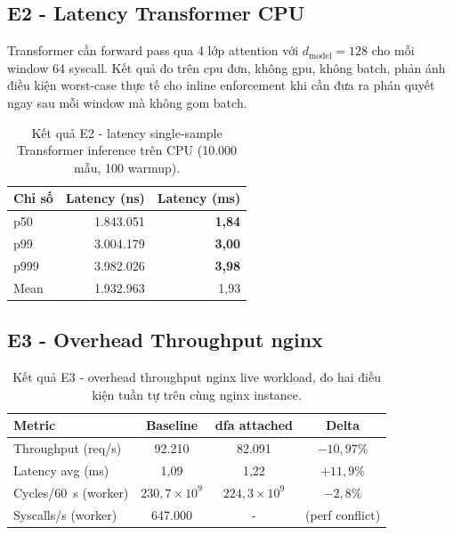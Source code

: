 \documentclass[../main.tex]{subfiles}
\begin{document}
\subsection{E2 - Latency Transformer CPU}
\label{subsec:p4_e2}

Transformer cần forward pass qua 4 lớp attention với $d_{\text{model}}=128$
cho mỗi window 64 \gls{syscall}. Kết quả đo trên \gls{cpu} đơn, không \gls{gpu}, không
batch, phản ánh điều kiện worst-case thực tế cho inline enforcement khi
cần đưa ra phán quyết ngay sau mỗi window mà không gom batch.

\begin{table}[h!]
  \caption{Kết quả E2 - latency single-sample Transformer inference trên
  CPU (10.000 mẫu, 100 warmup).}
  \label{tab:p4_e2}
  \centering
  \begin{tabular}{|l|r|r|}
    \hline
    \textbf{Chỉ số} & \textbf{Latency (ns)} & \textbf{Latency (ms)} \\ \hline
    p50   & 1.843.051 & \textbf{1,84} \\ \hline
    p99   & 3.004.179 & \textbf{3,00} \\ \hline
    p999  & 3.982.026 & \textbf{3,98} \\ \hline
    Mean  & 1.932.963 & 1,93         \\ \hline
  \end{tabular}
\end{table}

\subsection{E3 - Overhead Throughput nginx}
\label{subsec:p4_e3}

\begin{table}[h!]
  \caption{Kết quả E3 - overhead throughput nginx live workload, đo hai
  điều kiện tuần tự trên cùng nginx instance.}
  \label{tab:p4_e3}
  \centering
  \begin{tabular}{|l|c|c|c|}
    \hline
    \textbf{Metric} & \textbf{Baseline} & \textbf{\gls{dfa} attached} &
    \textbf{Delta} \\ \hline
    Throughput (req/s)        & 92.210              & 82.091
    & $-10{,}97\%$        \\ \hline
    Latency avg (ms)          & 1,09                & 1,22
    & $+11{,}9\%$         \\ \hline
    Cycles/60~s (worker)      & $230{,}7\times10^9$ &
    $224{,}3\times10^9$ & $-2{,}8\%$          \\ \hline
    Syscalls/s (worker)       & 647.000             & -
    & (perf conflict)     \\ \hline
  \end{tabular}
\end{table}
\end{document}
